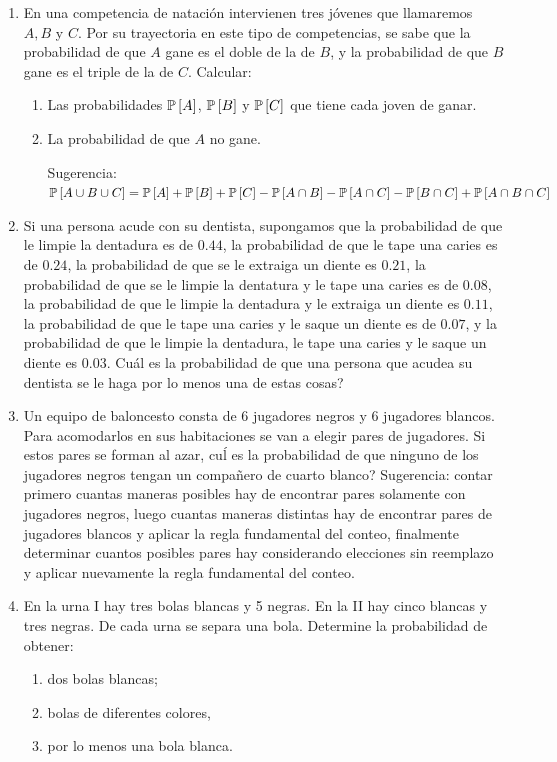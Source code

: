 \begin{Ejer}
\begin{enumerate}
\item En una competencia de nataci\'{o}n intervienen tres j\'{o}venes que llamaremos $A,B$ y $C$. Por su trayectoria en este tipo de competencias, se sabe que la probabilidad de que $A$ gane es el doble de la de $B$, y la probabilidad de que $B$ gane es el triple de la de $C$. Calcular:
\begin{enumerate}
\item Las probabilidades $\mathbb{P}\left[A\right]$, $\mathbb{P}\left[B\right]$ y $\mathbb{P}\left[C\right]$ que tiene cada joven de ganar.
\item La probabilidad de que $A$ no gane.

Sugerencia: $\mathbb{P}\left[A\cup B\cup C\right]=\mathbb{P}\left[A\right]+\mathbb{P}\left[B\right]+\mathbb{P}\left[C\right]-\mathbb{P}\left[A\cap B\right]-\mathbb{P}\left[A\cap C\right]-\mathbb{P}\left[B\cap C\right]+\mathbb{P}\left[A\cap B\cap C\right]$
\end{enumerate}

\item Si una persona acude con su dentista, supongamos que la probabilidad de que le limpie la dentadura es de $0.44$, la probabilidad de que le tape una caries es de $0.24$, la probabilidad de que se le extraiga un diente es  $0.21$, la probabilidad de que se le limpie la dentatura y le tape una caries es de $0.08$, la probabilidad de que le limpie la dentadura y le extraiga un diente es $0.11$, la probabilidad de que le tape una caries y le saque un diente es de $0.07$, y la probabilidad de que le limpie la dentadura, le tape una caries y le saque un diente es $0.03$.  Cu\'{a}l es la probabilidad de que una persona que acudea su dentista se le haga por lo menos una de estas cosas?

\item Un equipo de baloncesto consta de 6 jugadores negros y 6 jugadores blancos. Para acomodarlos en sus habitaciones se van a elegir pares de jugadores. Si estos pares se forman al azar,  cu\'l es la probabilidad de que ninguno de los jugadores negros tengan un compa\~nero de cuarto blanco? Sugerencia: contar primero cuantas maneras posibles hay de encontrar pares solamente con jugadores negros, luego cuantas maneras distintas hay de encontrar pares de jugadores blancos y aplicar la regla fundamental del conteo, finalmente determinar cuantos posibles pares hay considerando elecciones sin reemplazo y aplicar nuevamente la regla fundamental del conteo.

\item En la urna I hay tres bolas blancas y 5 negras. En la II hay cinco blancas y tres negras. De cada urna se separa una bola. Determine la probabilidad de obtener:
\begin{enumerate}
\item dos bolas blancas;
\item bolas de diferentes colores,
\item por lo menos una bola blanca.
\end{enumerate}
\end{enumerate}
\end{Ejer}

